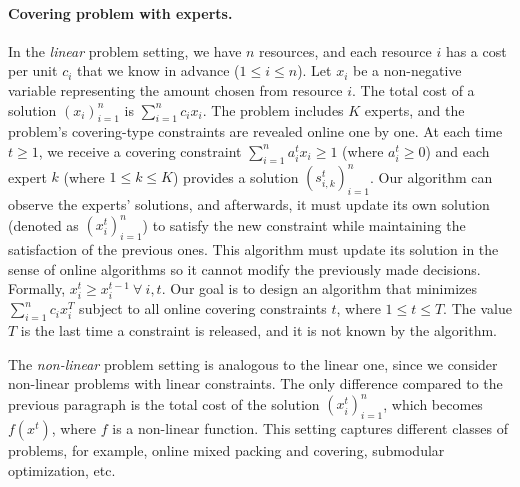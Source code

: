 \paragraph{Covering problem with experts.}
In the \emph{linear} problem setting, we have $n$ resources, and each resource $i$ has a cost per unit $c_{i}$ that we know in advance ($1 \leq i \leq n$).
Let $x_{i}$ be a non-negative variable representing the amount chosen from resource $i$.
The total cost of a solution $(x_{i})_{i=1}^{n}$ is $\sum_{i=1}^{n} c_{i} x_{i}$.
The problem includes $K$ experts, and the problem's covering-type constraints are revealed online one by one.
At each time $t \geq 1$, we receive a covering constraint $\sum_{i=1}^{n} a_{i}^{t} x_{i} \geq 1$ (where $a_{i}^{t} \geq 0$) and each expert $k$ (where $1 \leq k \leq K$) provides
a solution $(s_{i,k}^{t})_{i=1}^{n}$. Our algorithm can observe the experts' solutions, and afterwards, it must update its own solution (denoted as $(x_{i}^{t})_{i=1}^{n}$)
to satisfy the new constraint while maintaining the satisfaction of the previous ones. This algorithm must update its solution in the sense of online algorithms so it cannot modify the previously made decisions. Formally, $x_{i}^{t} \geq x_{i}^{t-1} ~\forall\ i, t$.
Our goal is to design an algorithm that minimizes $\sum_{i=1}^{n} c_{i} x_{i}^{T}$ subject to
all online covering constraints $t$, where $1 \leq t \leq T$. The value $T$ is the last time a constraint is released, and it is not known by the algorithm.

The \emph{non-linear} problem setting is analogous to the linear one, since we consider non-linear problems with linear constraints. The only difference compared to the previous paragraph is the total cost of the solution $(x_{i}^t)_{i=1}^{n}$, which becomes $f(x^t)$, where $f$ is a non-linear function. This setting captures different classes of problems, for example, online mixed packing and covering, submodular optimization, etc.  

